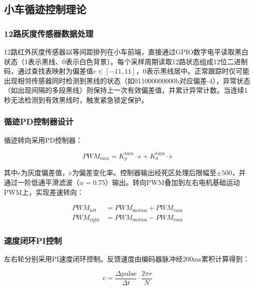 \documentclass[12pt,a4paper]{ctexart}
\begin{document}
\subsection{\textbf{小车循迹控制理论}}

\subsubsection{\textbf{12路灰度传感器数据处理}}

12路红外灰度传感器以等间距排列在小车前端，直接通过GPIO数字电平读取黑白状态（1表示黑线、0表示白色背景）。每个采样周期读取12路状态组成12位二进制码，通过查找表映射为偏差值$e \in [-11, 11]$，0表示黑线居中。正常跟踪时仅可能出现相邻传感器同时检测到黑线的状态（如011000000000b对应偏差-4），异常状态（如出现间隔的多段黑线）则保持上一次有效偏差值，并累计异常计数。当连续1秒无法检测到有效黑线时，触发紧急锁定保护。

\subsubsection{\textbf{循迹PD控制器设计}}

循迹转向采用PD控制器：

\begin{equation}
PWM_{\text{turn}} = K_p^{\text{turn}} \cdot e + K_d^{\text{turn}} \cdot \dot{e}
\end{equation}

其中$e$为灰度偏差值，$\dot{e}$为偏差变化率。控制器输出经死区处理后限幅至$\pm500$，并通过一阶低通平滑滤波（$\alpha=0.75$）输出。转向PWM叠加到左右电机基础运动PWM上，实现差速转向：

\begin{equation}
\begin{aligned}
PWM_{\text{left}} &= PWM_{\text{motion}} + PWM_{\text{turn}} \\
PWM_{\text{right}} &= PWM_{\text{motion}} - PWM_{\text{turn}}
\end{aligned}
\end{equation}

\subsubsection{\textbf{速度闭环PI控制}}

左右轮分别采用PI速度闭环控制。反馈速度由编码器脉冲经200ms累积计算得到：

\begin{equation}
v = \frac{\Delta\text{pulse}}{\Delta t} \cdot \frac{2\pi r}{N}
\end{equation}
\end{document}

